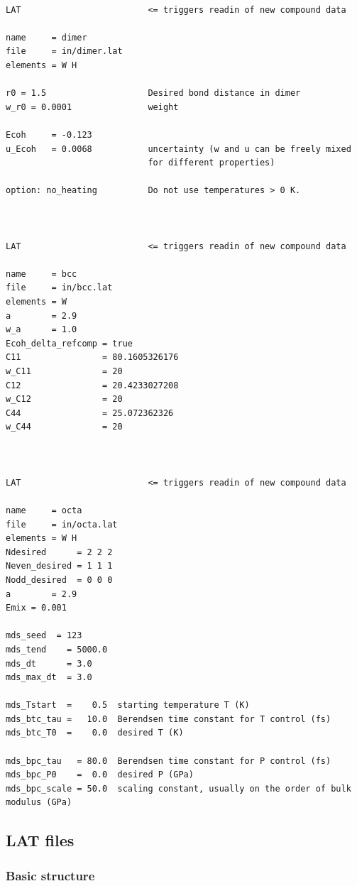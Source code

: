 \documentclass[a4paper,12pt,pdftex,onecolumn]{article}
\begin{document}
\begin{Verbatim}[fontsize=\relsize{-1},frame=single]

LAT                         <= triggers readin of new compound data

name     = dimer
file     = in/dimer.lat
elements = W H

r0 = 1.5                    Desired bond distance in dimer
w_r0 = 0.0001               weight

Ecoh     = -0.123
u_Ecoh   = 0.0068           uncertainty (w and u can be freely mixed
                            for different properties)

option: no_heating          Do not use temperatures > 0 K.



LAT                         <= triggers readin of new compound data

name     = bcc
file     = in/bcc.lat
elements = W
a        = 2.9
w_a      = 1.0
Ecoh_delta_refcomp = true
C11                = 80.1605326176
w_C11              = 20
C12                = 20.4233027208
w_C12              = 20
C44                = 25.072362326
w_C44              = 20



LAT                         <= triggers readin of new compound data

name     = octa
file     = in/octa.lat
elements = W H
Ndesired      = 2 2 2
Neven_desired = 1 1 1
Nodd_desired  = 0 0 0
a        = 2.9
Emix = 0.001

mds_seed  = 123
mds_tend    = 5000.0
mds_dt      = 3.0
mds_max_dt  = 3.0

mds_Tstart  =    0.5  starting temperature T (K)
mds_btc_tau =   10.0  Berendsen time constant for T control (fs)
mds_btc_T0  =    0.0  desired T (K)

mds_bpc_tau   = 80.0  Berendsen time constant for P control (fs)
mds_bpc_P0    =  0.0  desired P (GPa)
mds_bpc_scale = 50.0  scaling constant, usually on the order of bulk modulus (GPa)

\end{Verbatim}




\subsection{LAT files}


\subsubsection{Basic structure}
\end{document}
